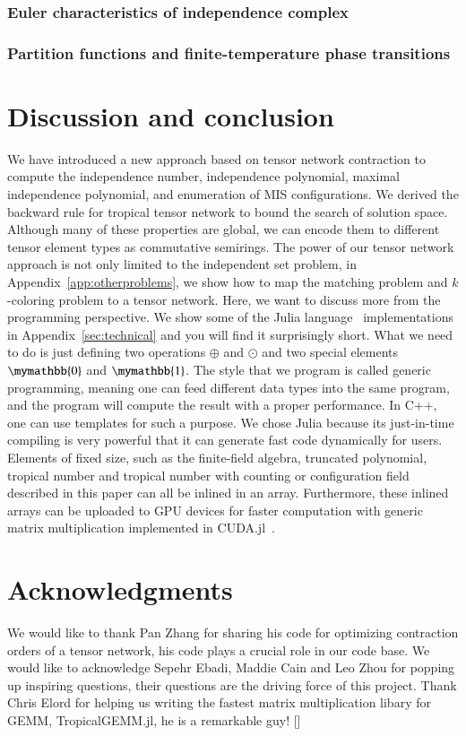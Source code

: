 \documentclass[onefignum, onetabnum]{siamart190516}
\newcommand{\<}{\langle}
\renewcommand{\>}{\rangle}
\newcommand{\App}[1]{Appendix~\ref{#1}}
\newcommand{\blue}[1]{[{\bf  \color{blue}{JG: #1}}]}
\begin{document}
\subsubsection{Euler characteristics of independence complex}

\subsubsection{Partition functions and finite-temperature phase transitions}



\section{Discussion and conclusion}
We have introduced a new approach based on tensor network contraction to compute the independence number, independence polynomial, maximal independence polynomial, and enumeration of MIS configurations.
We derived the backward rule for tropical tensor network to bound the search of solution space.
Although many of these properties are global, we can encode them to different tensor element types as commutative semirings.
The power of our tensor network approach is not only limited to the independent set problem, in \App{app:otherproblems}, we show how to map the matching problem and $k$-coloring problem to a tensor network.
Here, we want to discuss more from the programming perspective.
We show some of the Julia language~\cite{Bezanson2012} implementations in Appendix~\ref{sec:technical} and you will find it surprisingly short.
What we need to do is just defining two operations $\oplus$ and $\odot$ and two special elements $\mymathbb{0}$ and $\mymathbb{1}$.
The style that we program is called generic programming,
meaning one can feed different data types into the same program, and the program will compute the result with a proper performance.
In C++, one can use templates for such a purpose.
We chose Julia because its just-in-time compiling is very powerful that it can generate fast code dynamically for users.
Elements of fixed size, such as the finite-field algebra, truncated polynomial, tropical number and tropical number with counting or configuration field described in this paper can all be inlined in an array.
Furthermore, these inlined arrays can be uploaded to GPU devices for faster computation with generic matrix multiplication implemented in CUDA.jl~\cite{Besard2018}.

\section*{Acknowledgments}
We would like to thank Pan Zhang for sharing his code for optimizing contraction orders of a tensor network, his code plays a crucial role in our code base.
We would like to acknowledge Sepehr Ebadi, Maddie Cain and Leo Zhou for popping up inspiring questions,
their questions are the driving force of this project.
Thank Chris Elord for helping us writing the fastest matrix multiplication libary for GEMM, TropicalGEMM.jl, he is a remarkable guy!
\blue{funding information}
\end{document}
